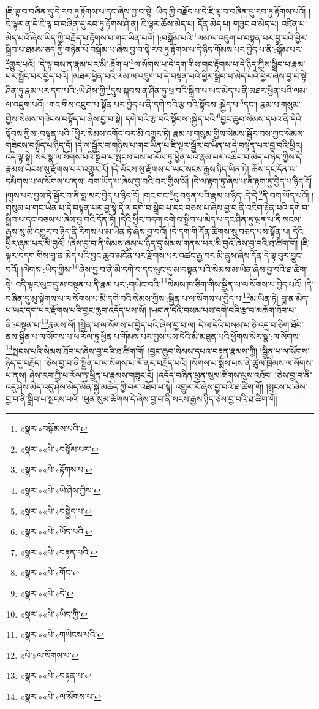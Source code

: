 །ཇི་ལྟ་བ་བཞིན་དུ་དེ་རབ་ཏུ་རྟོགས་པ་དང་ཞེས་བྱ་བ་སྟེ། ཡིད་ཀྱི་བརྗོད་པ་དེ་ཇི་ལྟ་བ་བཞིན་དུ་རབ་ཏུ་རྟོགས་པའོ། །ཇི་ལྟར་ན་དེ་ཇི་ལྟ་བ་བཞིན་དུ་རབ་ཏུ་རྟོགས་ཤེ་ན། ཇི་ལྟར་ཆོས་མེད་པ། དོན་མེད་པ། གཟུང་བ་མེད་པ། འཛིན་པ་མེད་པའོ་ཞེས་ཡིད་ཀྱི་བརྗོད་པ་རྟོགས་པ་གང་ཡིན་པའོ། །:བསྒོམ་པའི་\footnote{«སྣར་»བསྒོམས་པའི་}ལམ་ལ་འཇུག་པ་བསྟན་པར་བྱ་བའི་ཕྱིར་སྒྲིབ་པ་ཐམས་ཅད་ཀྱི་གཉེན་པོ་བསྒོམ་པ་ཞེས་བྱ་བ་སྟེ་རབ་ཏུ་རྟོགས་པ་དེ་ཉིད་གོམས་པར་བྱེད་པ་ནི་:སྒོམ་པར་\footnote{«སྣར་»«པེ་»བསྒོམ་པར་}གྱུར་པའོ། །དེ་ལྟ་བས་ན་རྣམ་པར་མི་:རྟོག་པ་\footnote{«སྣར་»«པེ་»རྟོགས་པ་}ལ་སོགས་པ་དེ་དག་གིས་གང་རྟོགས་པ་དེ་ཉིད་ཀྱིས་སྒྲིབ་པ་རྣམ་པར་སྦྱོང་བར་བྱེད་པའོ། །མཐར་ཕྱིན་པའི་ལམ་ལ་འཇུག་པ་དེ་བསྟན་པའི་ཕྱིར་སྒྲིབ་པ་མེད་པའི་ཕྱིར་ཞེས་བྱ་བ་སྟེ། ཤིན་ཏུ་རྣམ་པར་དག་པའི་:ཡེ་ཤེས་ཀྱི་\footnote{«སྣར་»«པེ་»ཡེ་ཤེས་ཀྱིས་}དུས་སྐབས་ན་ཤིན་ཏུ་ཕྲ་བའི་སྒྲིབ་པ་ཡང་མེད་པ་ནི་མཐར་ཕྱིན་པའི་ལམ་ལ་འཇུག་པའོ། །གང་གིས་འཇུག་པ་སྟོན་པར་བྱེད་པ་ནི་དགེ་བའི་རྩ་བའི་སྟོབས་:སྐྱེད་པ་\footnote{«སྣར་»«པེ་»བསྐྱེད་པ་}དང་། རྣམ་པ་གསུམ་གྱིས་སེམས་གཟེངས་བསྟོད་པ་ཞེས་བྱ་བ་སྟེ། དགེ་བའི་རྩ་བའི་སྟོབས་:སྐྱེད་པའི་\footnote{«སྣར་»«པེ་»ཡོད་པའི་}བྱང་ཆུབ་སེམས་དཔའ་ནི་དེའི་སྟོབས་ཀྱིས་:བསྟན་པའི་\footnote{«སྣར་»«པེ་»བརྟན་པའི་}ཕྱིར་སེམས་འགོང་བར་མི་འགྱུར་ཏེ། རྣམ་པ་གསུམ་གྱིས་སེམས་སྦྱོར་བས་ཀྱང་སེམས་གཟེངས་བསྟོད་པ་ཉིད་དོ། །དེ་ལ་སྦྱོར་བ་གཉིས་པ་གང་ཡིན་པ་ཇི་ལྟར་སྦྱོར་བ་ཡིན་པ་དེ་བསྟན་པར་བྱ་བའི་ཕྱིར། འདི་ལྟ་སྟེ། སེར་སྣ་ལ་སོགས་པའི་སྒྲིབ་པ་སྤངས་པས་ཕ་རོལ་ཏུ་ཕྱིན་པའི་རྣམ་པར་འཆིང་བ་མེད་པ་ཉིད་ཀྱིས་དེ་རྣམས་ཡོངས་སུ་རྫོགས་པར་འགྱུར་རོ། །དེ་ཡོངས་སུ་རྫོགས་པ་ཡང་སངས་རྒྱས་ཉིད་ཡིན་ཏེ། ཆོས་དང་དོན་ལ་དམིགས་པ་ལ་སོགས་པ་ནས། བག་ཡོད་པ་ཞེས་བྱ་བའི་བར་གྱིས་སོ། །དེ་ལ་རྟག་ཏུ་ཞེས་པ་ནི་རྟག་ཏུ་བྱེད་པ་ཉིད་དོ། །གུས་པར་བྱས་ཏེ་སྦྱོར་བ་ནི་བླ་མར་བྱེད་པ་ཉིད་དོ། །གང་གང་\footnote{«སྣར་»«པེ་»གོང་}དུ་བསྟན་པའི་རྣམ་པ་ཉིད་:དེ་དེ་\footnote{«སྣར་»«པེ་»དེ་}ནི་བག་ཡོད་པའོ། །གསུམ་པ་གང་ཡིན་པ་དེ་བསྟན་པར་བྱ་སྟེ་དེ་ལ་དགེ་བ་སྒྲིབ་པ་དང་བཅས་པ་ཞེས་བྱ་བ་ནི་འཇིག་རྟེན་པའི་དགེ་བ་སྒྲིབ་པ་དང་བཅས་པ་ཞེས་བྱ་བའི་དོན་ཏོ། །དེའི་ཕྱིར་བདག་དགེ་བ་སྒྲིབ་པ་མེད་པ་དང་ཤིན་ཏུ་ལྡན་པ་ནི་སངས་རྒྱས་སུ་མི་འགྱུར་བ་ཉིད་ནི་རིགས་པ་མ་ཡིན་ཏེ་ཞེས་བྱ་བའོ། །དེ་དག་གི་དོན་ཚིགས་སུ་བཅད་པས་སྟོན་པ། དེའི་ཕྱིར་ཞུམ་པར་མི་བྱའོ། །ཞེས་བྱ་བ་ནི་སེམས་ཞུམ་པ་ཉིད་དུ་སེམས་གནས་པར་མི་བྱའོ་ཞེས་བྱ་བའི་ཐ་ཚིག་གོ། །ཇི་ལྟར་བདག་གིས་བླ་ན་མེད་པའི་བྱང་ཆུབ་མངོན་པར་རྫོགས་པར་འཚང་རྒྱ་བར་མི་ནུས་ཞེས་དོན་དེ་ལྟ་བུར་བྱུང་བའོ། །ལེགས་:ཡིད་ཀྱིས་\footnote{«སྣར་»«པེ་»ཡིད་ཀྱི་}ཞེས་བྱ་བ་ནི་མི་དགེ་བ་དང་ལུང་དུ་མ་བསྟན་པའི་སེམས་མ་ཡིན་ཞེས་བྱ་བའི་ཐ་ཚིག་སྟེ། འདི་ལྟར་ལུང་དུ་མ་བསྟན་པ་ནི་རྣམ་པར་:གཡེང་བའི་\footnote{«སྣར་»«པེ་»གཡེངས་པའི་}སེམས་ཁ་ཅིག་གིས་སྦྱིན་པ་ལ་སོགས་པ་བྱེད་པའོ། །དེ་བཞིན་དུ་མུ་སྟེགས་པ་ལ་སོགས་པ་མི་དགེ་བའི་སེམས་ཀྱིས་:སྦྱིན་པ་ལ་སོགས་པ་བྱེད་པ་\footnote{«པེ་»ལ་སོགས་པ་}མ་ཡིན་ཏེ། བླ་ན་མེད་པ་ཡང་དག་པར་རྫོགས་པའི་བྱང་ཆུབ་འདོད་པས་སོ། །ཡང་ན་དེའི་བསམ་པས་དགེ་བའི་རྩ་བ་མཆོག་ཐོབ་པ་ནི་:བསྟན་པ་\footnote{«སྣར་»«པེ་»བརྟན་པ་}རྣམས་སོ། །སྦྱིན་པ་ལ་སོགས་པ་བྱེད་པའི་ཞེས་བྱ་བ་ལ། དེ་ལ་དེའི་བསམ་པ་ཅི་འདྲ་བ་ཅིག་ཐོབ་ནས་སྦྱིན་པ་ལ་སོགས་པ་ཕ་རོལ་ཏུ་ཕྱིན་པ་གོམས་པར་བྱས་པས་དེའི་མི་མཐུན་པའི་ཕྱོགས་སེར་སྣ་:ལ་སོགས་\footnote{«སྣར་»«པེ་»ལ་སོགས་པ་}སྤངས་པའི་སེམས་ཐོབ་པ་ཞེས་བྱ་བའི་ཐ་ཚིག་གོ། །བྱང་ཆུབ་སེམས་དཔའ་བརྟན་རྣམས་ཀྱི། །སྦྱིན་པ་ལ་སོགས་ཉིད་དུ་བརྗོད། །ཅེས་བྱ་བ་ནི་སྦྱིན་པ་ལ་སོགས་པ་ཁོ་ནར་བརྗོད་པའོ། །སོགས་པ་སྨོས་པས་ནི་ཚུལ་ཁྲིམས་ལ་སོགས་པ་ནས། ཤེས་རབ་ཀྱི་ཕ་རོལ་ཏུ་ཕྱིན་པ་རྣམས་གཟུང་ངོ། །འདོད་བཞིན་ཕུན་སུམ་ཚོགས་ལུས་འཐོབ། །ཅེས་བྱ་བ་ནི་འདུ་ཤེས་མེད་འདུ་ཤེས་མེད་མིན་སྐྱེ་མཆེད་ཀྱི་བར་འཐོབ་པ་སྟེ། འགྱུར་རོ་ཞེས་བྱ་བའི་ཐ་ཚིག་གོ། །སྤངས་པ་ཞེས་བྱ་བ་ནི་སྒྲིབ་པ་སྤངས་པའོ། །ཕུན་སུམ་ཚོགས་དེ་ཞེས་བྱ་བ་ནི་སངས་རྒྱས་ཉིད་ཅེས་བྱ་བའི་ཐ་ཚིག་གོ། 